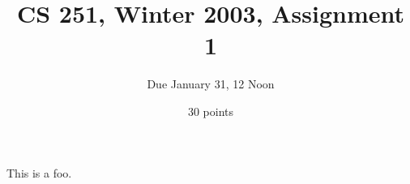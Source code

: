 \documentclass{article}
\begin{document}
\title{CS 251, Winter 2003, Assignment 1}
\author{Due January 31, 12 Noon}
\date{30 points}
\maketitle
This is a foo.
\end{document}

